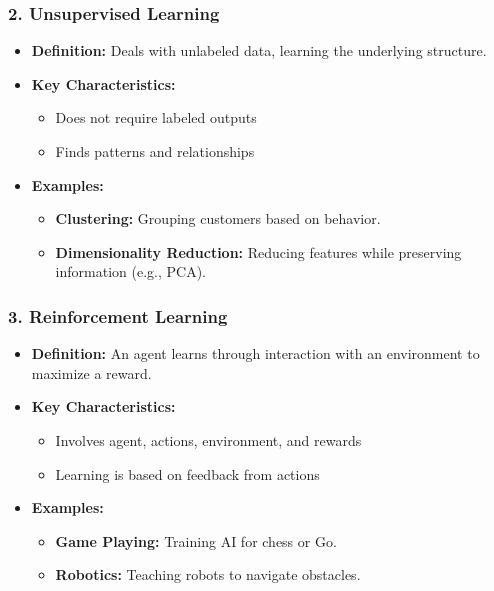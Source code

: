 \documentclass[aspectratio=169]{beamer}
\begin{document}
\begin{frame}[fragile]
    \frametitle{2. Unsupervised Learning}
    \begin{itemize}
        \item \textbf{Definition:} Deals with unlabeled data, learning the underlying structure.
        \item \textbf{Key Characteristics:}
        \begin{itemize}
            \item Does not require labeled outputs
            \item Finds patterns and relationships
        \end{itemize}
        \item \textbf{Examples:}
        \begin{itemize}
            \item \textbf{Clustering:} Grouping customers based on behavior.
            \item \textbf{Dimensionality Reduction:} Reducing features while preserving information (e.g., PCA).
        \end{itemize}
    \end{itemize}
\end{frame}

\begin{frame}[fragile]
    \frametitle{3. Reinforcement Learning}
    \begin{itemize}
        \item \textbf{Definition:} An agent learns through interaction with an environment to maximize a reward.
        \item \textbf{Key Characteristics:}
        \begin{itemize}
            \item Involves agent, actions, environment, and rewards
            \item Learning is based on feedback from actions
        \end{itemize}
        \item \textbf{Examples:}
        \begin{itemize}
            \item \textbf{Game Playing:} Training AI for chess or Go.
            \item \textbf{Robotics:} Teaching robots to navigate obstacles.
        \end{itemize}
    \end{itemize}
\end{frame}
\end{document}
